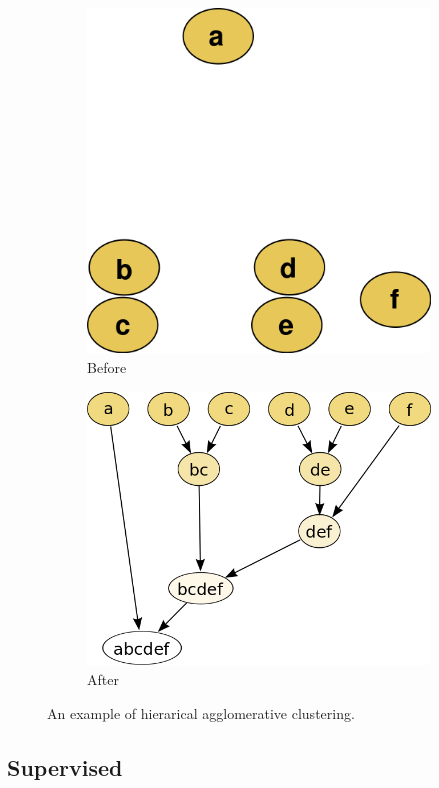 \begin{figure}[htbp]
  \centering
  \begin{subfigure}[b]{0.49\textwidth} 
    \centering
    \includegraphics[width=\textwidth]{figures/dendrogram1.png}
    \caption{Before}
  \end{subfigure}
  \begin{subfigure}[b]{0.49\textwidth}
	\centering
    \includegraphics[width=\textwidth]{figures/dendrogram2.png}
    \caption{After}
  \end{subfigure}
  \caption{An example of hierarical agglomerative clustering.}
  \label{fig:hac}
\end{figure}

\subsection*{Supervised}
